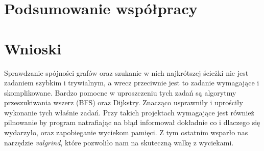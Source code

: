\documentclass[10pt, a4paper]{report}
\begin{document}
    \section{Podsumowanie współpracy}


    \section{Wnioski}
    Sprawdzanie spójności grafów oraz szukanie w nich najkrótszej ścieżki nie jest zadaniem szybkim i trywialnym, a wrecz przeciwnie jest to zadanie wymagające i skomplikowane.
    Bardzo pomocne w uproszczeniu tych zadań są algorytmy przeszukiwania wszerz (BFS) oraz Dijkstry. Znacząco usprawniły i uprościły wykonanie tych właśnie zadań.
    Przy takich projektach wymagające jest również pilnowanie by program natrafiając na błąd informował dokładnie co i dlaczego się wydarzyło, oraz zapobieganie wyciekom pamięci.
    Z tym ostatnim wsparło nas narzędzie \textit{valgrind}, które pozwoliło nam na skuteczną walkę z wyciekami.
\end{document}

